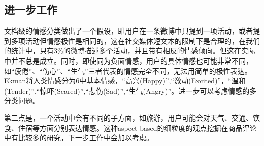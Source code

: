 \subsection{进一步工作}
文档级的情感分类做出了一个假设，即用户在一条微博中只提到一项活动，或者提到多项活动但情感极性是相同的，这在社交媒体短文本的限制下是合理的，在我们的统计中，只有3\%的微博描述多个活动，并且带有相反的情感倾向。但这在实际中并不总是成立。同时，即使同为负面情感，用户的具体情感也可能非常不同，如``疲倦''、``伤心''、``生气''三者代表的情感完全不同，无法用简单的极性表达。Ekman\cite{ekman1992argument}将人类情感分为6中基本情感，``高兴(Happy)'',``激动(Excited)''，``温和(Tender)'',``惊吓(Scared)'',``悲伤(Sad)'',``生气(Angry)''。进一步可以考虑情感的多分类问题。

第二点是，一个活动中会有不同的子方面，如旅游，用户可能会对天气、交通、饮食、住宿等方面分别表达情感。这种aspect-based的细粒度的观点挖掘在商品评论中有比较多的研究，下一步工作中会加以考虑。



